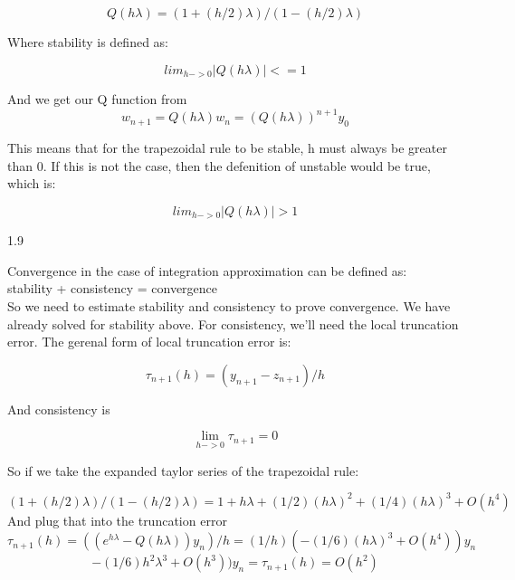 \documentclass{article}
\begin{document}
\begin{equation}
    Q(h\lambda) = (1+(h/2)\lambda)/(1-(h/2)\lambda)
\end{equation}

Where stability is defined as:

\begin{equation}
    lim_{h->0}|Q(h\lambda)|< = 1
\end{equation}

And we get our Q function from
\begin{equation}
    w_{n+1} = Q(h\lambda)w_n = (Q(h\lambda))^{n+1}y_0
\end{equation}

This means that for the trapezoidal rule to be stable, h must always be greater than 0. If this is not the case,
then the defenition of unstable would be true, which is:

\begin{equation}
    lim_{h->0}|Q(h\lambda)|> 1
\end{equation}

\begin{flushleft}
1.9
\end{flushleft}

Convergence in the case of integration approximation can be defined as: \\

stability + consistency = convergence\\

So we need to estimate stability and consistency to prove convergence. We have
already solved for stability above. For consistency, we'll need the local truncation error.
The gerenal form of local truncation error is:

\begin{equation}
    \tau_{n+1}(h) = (y_{n+1} - z_{n+1})/h
\end{equation}

And consistency is

\begin{equation}
    \lim_{h->0}\tau_{n+1} = 0
\end{equation}

So if we take the expanded taylor series of the trapezoidal rule:

\begin{equation}
    (1+(h/2)\lambda)/(1-(h/2)\lambda) = 1 + h\lambda + (1/2)(h\lambda)^2 + (1/4)(h\lambda)^3 + O(h^4)
\end{equation}
And plug that into the truncation error
\begin{equation}
    \tau_{n+1}(h) = ((e^{h\lambda} - Q(h\lambda))y_n)/h = (1/h)(-(1/6)(h\lambda)^3 + O(h^4))y_n    
\end{equation}
\begin{equation}
    -(1/6)h^2\lambda^3 + O(h^3))y_n = \tau_{n+1}(h) = O(h^2)
\end{equation}
\end{document}
